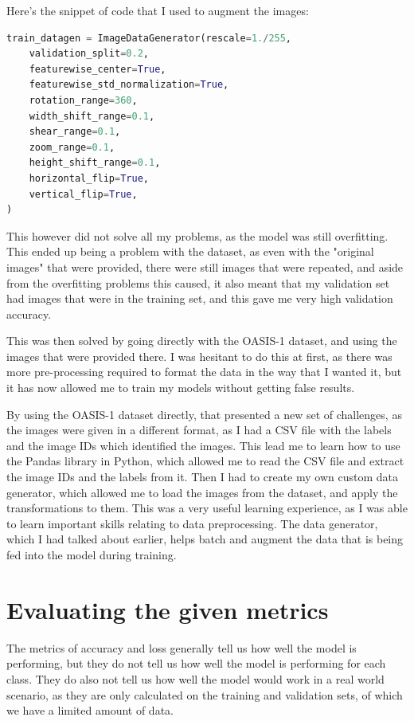 \documentclass[]{final_report}
\begin{document}
Here's the snippet of code that I used to augment the images:
\begin{lstlisting}[language=Python]
train_datagen = ImageDataGenerator(rescale=1./255,
    validation_split=0.2,
    featurewise_center=True,
    featurewise_std_normalization=True,
    rotation_range=360,
    width_shift_range=0.1,
    shear_range=0.1,
    zoom_range=0.1,
    height_shift_range=0.1,
    horizontal_flip=True,
    vertical_flip=True,
)
\end{lstlisting}

\pagebreak

This however did not solve all my problems, as the model was still overfitting. This ended up being a problem with the dataset, as even with the "original images" that were provided, there were still images that were repeated, and aside from the overfitting problems this caused, it also meant that my validation set had images that were in the training set, and this gave me very high validation accuracy.

This was then solved by going directly with the OASIS-1 dataset, and using the images that were provided there. I was hesitant to do this at first, as there was more pre-processing required to format the data in the way that I wanted it, but it has now allowed me to train my models without getting false results.

By using the OASIS-1 dataset directly, that presented a new set of challenges, as the images were given in a different format, as I had a CSV file with the labels and the image IDs which identified the images. This lead me to learn how to use the Pandas\cite{Pandas} library in Python, which allowed me to read the CSV file and extract the image IDs and the labels from it. Then I had to create my own custom data generator, which allowed me to load the images from the dataset, and apply the transformations to them. This was a very useful learning experience, as I was able to learn important skills relating to data preprocessing. The data generator, which I had talked about earlier, helps batch and augment the data that is being fed into the model during training.

\section{Evaluating the given metrics}
The metrics of accuracy and loss generally tell us how well the model is performing,
but they do not tell us how well the model is performing for each class.
They do also not tell us how well the model would work in a real world scenario,
as they are only calculated on the training and validation sets, of which we have a limited amount of data.
\end{document}
